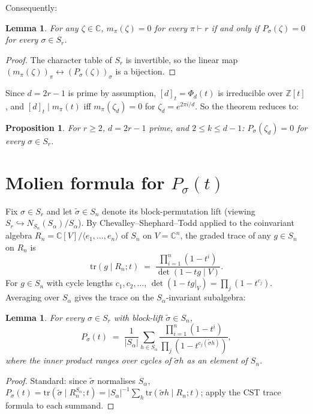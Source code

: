 \documentclass[11pt]{article}
\newtheorem{proposition}[theorem]{Proposition}
\newtheorem{lemma}[theorem]{Lemma}
\theoremstyle{definition}
\theoremstyle{remark}
\newcommand{\CC}{\mathbb{C}}
\newcommand{\ZZ}{\mathbb{Z}}
\begin{document}
Consequently:
\begin{lemma}\label{lem:reduce}
For any $\zeta \in \CC$, $m_\pi(\zeta) = 0$ for every $\pi \vdash r$ if
and only if $P_\sigma(\zeta) = 0$ for every $\sigma \in S_r$.
\end{lemma}

\begin{proof}
The character table of $S_r$ is invertible, so the linear map
$(m_\pi(\zeta))_\pi \leftrightarrow (P_\sigma(\zeta))_\sigma$ is a bijection.
\end{proof}

Since $d = 2r - 1$ is prime by assumption, $[d]_t = \Phi_d(t)$ is
irreducible over $\ZZ[t]$, and $[d]_t \mid m_\pi(t)$ iff $m_\pi(\zeta_d) = 0$
for $\zeta_d = e^{2\pi i/d}$. So the theorem reduces to:

\begin{proposition}\label{prop:main}
For $r \ge 2$, $d = 2r - 1$ prime, and $2 \le k \le d - 1$:
$P_\sigma(\zeta_d) = 0$ for every $\sigma \in S_r$.
\end{proposition}

\section{Molien formula for $P_\sigma(t)$}

Fix $\sigma \in S_r$ and let $\tilde\sigma \in S_n$ denote its
block-permutation lift (viewing $S_r \hookrightarrow N_{S_n}(S_\alpha) / S_\alpha$).
By Chevalley--Shephard--Todd applied to the coinvariant algebra
$R_n = \CC[V]/\langle e_1, \ldots, e_n\rangle$ of $S_n$ on $V = \CC^n$, the
graded trace of any $g \in S_n$ on $R_n$ is
\[
\text{tr}(g \mid R_n; t) \;=\; \frac{\prod_{i=1}^{n}(1 - t^i)}{\det(1 - tg \mid V)}.
\]
For $g \in S_n$ with cycle lengths $c_1, c_2, \ldots$,
$\det(1 - tg|_V) = \prod_j (1 - t^{c_j})$.  Averaging over $S_\alpha$
gives the trace on the $S_\alpha$-invariant subalgebra:

\begin{lemma}\label{lem:molien}
For every $\sigma \in S_r$ with block-lift $\tilde\sigma \in S_n$,
\[
P_\sigma(t) \;=\;
\frac{1}{|S_\alpha|} \sum_{h \in S_\alpha}
\frac{\prod_{i=1}^{n}(1 - t^i)}{\prod_j (1 - t^{c_j(\tilde\sigma h)})},
\]
where the inner product ranges over cycles of $\tilde\sigma h$ as an
element of $S_n$.
\end{lemma}

\begin{proof}
Standard: since $\tilde\sigma$ normalises $S_\alpha$,
$P_\sigma(t) = \text{tr}(\tilde\sigma \mid R_n^{S_\alpha}; t)
= |S_\alpha|^{-1} \sum_h \text{tr}(\tilde\sigma h \mid R_n; t)$;
apply the CST trace formula to each summand.
\end{proof}
\end{document}
